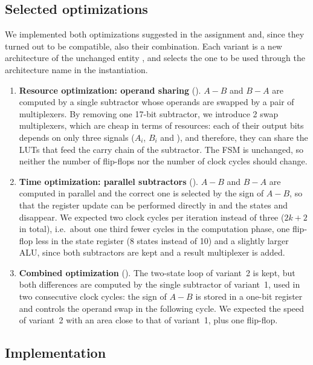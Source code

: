 \subsection{Selected optimizations}

We implemented both optimizations suggested in the assignment and, since they turned out to be compatible, also their combination. Each variant is a new architecture of the unchanged entity , and  selects the one to be used through the architecture name in the instantiation.

\begin{enumerate}
    \item \textbf{Resource optimization: operand sharing} (). $A-B$ and $B-A$ are computed by a single subtractor whose operands are swapped by a pair of multiplexers. By removing one 17-bit subtractor, we introduce 2 swap multiplexers, which are cheap in terms of resources: each of their output bits depends on only three signals ($A_i$, $B_i$ and ), and therefore, they can share the LUTs that feed the carry chain of the subtractor. The FSM is unchanged, so neither the number of flip-flops nor the number of clock cycles should change.
    \item \textbf{Time optimization: parallel subtractors} (). $A-B$ and $B-A$ are computed in parallel and the correct one is selected by the sign of $A-B$, so that the register update can be performed directly in  and the states  and  disappear. We expected two clock cycles per iteration instead of three ($2k+2$ in total), i.e.\ about one third fewer cycles in the computation phase, one flip-flop less in the state register (8 states instead of 10) and a slightly larger ALU, since both subtractors are kept and a result multiplexer is added.
    \item \textbf{Combined optimization} (). The two-state loop of variant~2 is kept, but both differences are computed by the single subtractor of variant~1, used in two consecutive clock cycles: the sign of $A-B$ is stored in a one-bit register and controls the operand swap in the following cycle. We expected the speed of variant~2 with an area close to that of variant~1, plus one flip-flop.
\end{enumerate}

\subsection{Implementation}

